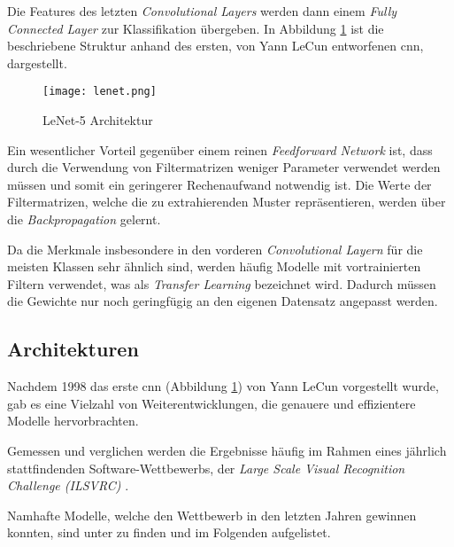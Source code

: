 Die Features des letzten \textit{Convolutional Layers}
werden dann einem \textit{Fully Connected Layer}
zur Klassifikation übergeben.
In Abbildung \ref{fig:lenet} ist die beschriebene 
Struktur anhand des ersten, von Yann LeCun 
entworfenen \Gls{cnn}, dargestellt.
\vspace{1cm}

\begin{figure}[H]
    \centering
    \texttt{[image: lenet.png]}
    \caption{LeNet-5 Architektur
    \cite{lecunGradientBasedLearningApplied1998}}
    \label{fig:lenet}
\end{figure}
\vspace{1cm}

Ein wesentlicher Vorteil gegenüber einem reinen 
\textit{Feedforward Network} ist, dass 
durch die Verwendung von Filtermatrizen 
weniger Parameter verwendet werden müssen
und somit ein geringerer Rechenaufwand notwendig ist.
Die Werte der Filtermatrizen, welche die zu 
extrahierenden Muster repräsentieren, 
werden über die \textit{Backpropagation} gelernt.

Da die Merkmale insbesondere in den vorderen 
\textit{Convolutional Layern} für die meisten 
Klassen sehr ähnlich sind,
werden häufig Modelle mit vortrainierten Filtern 
verwendet, was als \textit{Transfer Learning}
bezeichnet wird.
Dadurch müssen die Gewichte nur noch geringfügig 
an den eigenen Datensatz angepasst werden.



\subsection{Architekturen}\label{subsubsec:architectures}

Nachdem 1998 das erste \Gls{cnn} (Abbildung \ref{fig:lenet})
 von Yann LeCun 
\cite{lecunGradientBasedLearningApplied1998} 
vorgestellt wurde, gab es eine Vielzahl 
von Weiterentwicklungen, die genauere und 
effizientere Modelle hervorbrachten.

Gemessen und verglichen werden die Ergebnisse häufig 
im Rahmen eines jährlich stattfindenden Software-Wettbewerbs, 
der \textit{Large Scale Visual Recognition Challenge (ILSVRC)}
\cite{ILSVRC15}.

Namhafte Modelle, welche den Wettbewerb in den letzten 
Jahren gewinnen konnten, sind unter \cite{stanfordConvNetList}
zu finden und im Folgenden aufgelistet.


